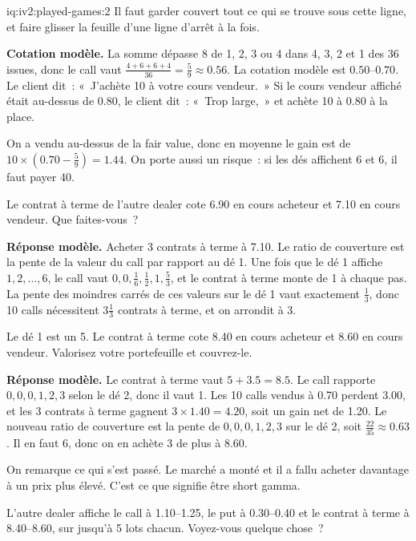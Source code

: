 \begin{solution}{iq:iv2:played-games:2}
Il faut garder couvert tout ce qui se trouve sous cette ligne, et faire glisser la feuille d'une ligne d'arrêt à la fois.

\ivstop

\textbf{Cotation modèle.} La somme dépasse 8 de 1, 2, 3 ou 4 dans 4, 3, 2 et 1 des 36 issues, donc le call vaut $\frac{4 + 6 + 6 + 4}{36} = \frac59 \approx 0.56$. La cotation modèle est $0.50$--$0.70$. Le client dit~: «~J'achète 10 à votre cours vendeur.~» Si le cours vendeur affiché était au-dessus de 0.80, le client dit~: «~Trop large,~» et achète 10 à 0.80 à la place.

On a vendu au-dessus de la fair value, donc en moyenne le gain est de $10 \times (0.70 - \frac59) = 1.44$. On porte aussi un risque~: si les dés affichent 6 et 6, il faut payer 40.

Le contrat à terme de l'autre dealer cote 6.90 en cours acheteur et 7.10 en cours vendeur. Que faites-vous~?
\ivstop

\textbf{Réponse modèle.} Acheter 3 contrats à terme à 7.10. Le ratio de couverture est la pente de la valeur du call par rapport au dé 1. Une fois que le dé 1 affiche $1, 2, \dots, 6$, le call vaut $0, 0, \frac16, \frac12, 1, \frac53$, et le contrat à terme monte de 1 à chaque pas. La pente des moindres carrés de ces valeurs sur le dé 1 vaut exactement $\frac13$, donc 10 calls nécessitent $3\tfrac13$ contrats à terme, et on arrondit à 3.

Le dé 1 est un 5. Le contrat à terme cote 8.40 en cours acheteur et 8.60 en cours vendeur. Valorisez votre portefeuille et couvrez-le.
\ivstop

\textbf{Réponse modèle.} Le contrat à terme vaut $5 + 3.5 = 8.5$. Le call rapporte $0, 0, 0, 1, 2, 3$ selon le dé 2, donc il vaut 1. Les 10 calls vendus à 0.70 perdent 3.00, et les 3 contrats à terme gagnent $3 \times 1.40 = 4.20$, soit un gain net de 1.20. Le nouveau ratio de couverture est la pente de $0, 0, 0, 1, 2, 3$ sur le dé 2, soit $\frac{22}{35} \approx 0.63$. Il en faut 6, donc on en achète 3 de plus à 8.60.

On remarque ce qui s'est passé. Le marché a monté et il a fallu acheter davantage à un prix plus élevé. C'est ce que signifie être short gamma.

L'autre dealer affiche le call à 1.10--1.25, le put à 0.30--0.40 et le contrat à terme à 8.40--8.60, sur jusqu'à 5 lots chacun. Voyez-vous quelque chose~?
\ivstop


\end{solution}
